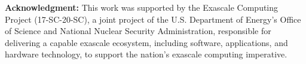 \noindent
{\bf Acknowledgment:} This work was supported by the Exascale Computing Project (17-SC-20-SC), a joint project of the U.S. Department of Energy’s Office of Science and National Nuclear Security Administration, responsible for delivering a capable exascale ecosystem, including software, applications, and hardware technology, to support the nation’s exascale computing imperative. 
  
  